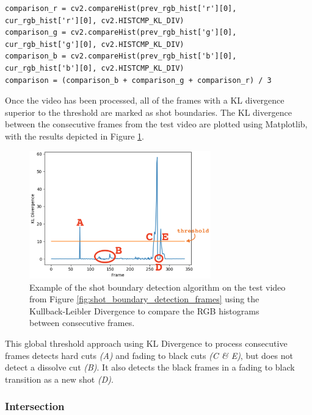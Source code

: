 \begin{lstlisting}[numbers=none]
comparison_r = cv2.compareHist(prev_rgb_hist['r'][0], cur_rgb_hist['r'][0], cv2.HISTCMP_KL_DIV)
comparison_g = cv2.compareHist(prev_rgb_hist['g'][0], cur_rgb_hist['g'][0], cv2.HISTCMP_KL_DIV)
comparison_b = cv2.compareHist(prev_rgb_hist['b'][0], cur_rgb_hist['b'][0], cv2.HISTCMP_KL_DIV)
comparison = (comparison_b + comparison_g + comparison_r) / 3
\end{lstlisting}

Once the video has been processed, all of the frames with a KL divergence superior to the threshold are marked as shot boundaries. The KL divergence between the consecutive frames from the test video are plotted using Matplotlib, with the results depicted in Figure \ref{fig:shot_boundary_detection_example}.\\

\begin{figure}[h] 
\centerline{\includegraphics[width=0.70\textwidth]{figures/implementation/shot_boundary_detection_example.png}}
\caption{\label{fig:shot_boundary_detection_example}Example of the shot boundary detection algorithm on the test video from Figure    \ref{fig:shot_boundary_detection_frames} using the Kullback-Leibler Divergence to compare the RGB histograms between consecutive frames.}
\end{figure}

This global threshold approach using KL Divergence to process consecutive frames detects hard cuts \textit{(A)} and fading to black cuts \textit{(C \& E)}, but does not detect a dissolve cut \textit{(B)}. It also detects the black frames in a fading to black transition as a new shot \textit{(D)}.

\subsubsection{Intersection}

